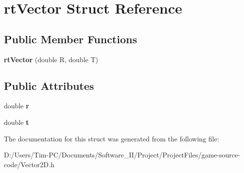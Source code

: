 \hypertarget{structrt_vector}{}\section{rt\+Vector Struct Reference}
\label{structrt_vector}
\subsection*{Public Member Functions}
\begin{DoxyCompactItemize}
\item 
\mbox{\label{structrt_vector_a97268ebbcad1df534201f5225f7ccbb0}} 
{\bfseries rt\+Vector} (double R, double T)
\end{DoxyCompactItemize}
\subsection*{Public Attributes}
\begin{DoxyCompactItemize}
\item 
\mbox{\label{structrt_vector_aae522780f6ddbf1a8d45dc69e89ab1b8}} 
double {\bfseries r}
\item 
\mbox{\label{structrt_vector_a8ab4ea9b5dfa69f99fcb5e62dd9b138d}} 
double {\bfseries t}
\end{DoxyCompactItemize}


The documentation for this struct was generated from the following file\+:\begin{DoxyCompactItemize}
\item 
D\+:/\+Users/\+Tim-\/\+P\+C/\+Documents/\+Software\+\_\+\+I\+I/\+Project/\+Project\+Files/game-\/source-\/code/Vector2\+D.\+h\end{DoxyCompactItemize}
